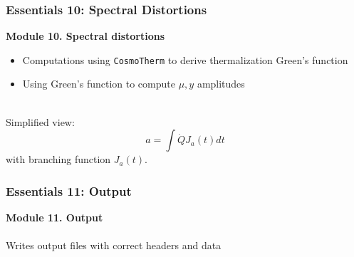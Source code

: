 \begin{frame}[fragile]
	\frametitle{Essentials 10: Spectral Distortions}
	
	{\bf Module 10. Spectral distortions}\\
	\begin{itemize}
		\item
		Computations using \texttt{CosmoTherm} to derive thermalization Green's function
		\item Using Green's function to compute $\mu,y$ amplitudes
	\end{itemize}

	\mbox{}\\
	Simplified view:
	\begin{equation}
		a = \int \dot{Q} J_a(t) dt
	\end{equation}
	with branching function $J_a(t)$.\\[1ex]
	
\end{frame}




\begin{frame}[fragile]
	\frametitle{Essentials 11: Output}
	
	{\bf Module 11. Output}\\
	\mbox{}\\
	Writes output files with correct headers and data
\end{frame}



